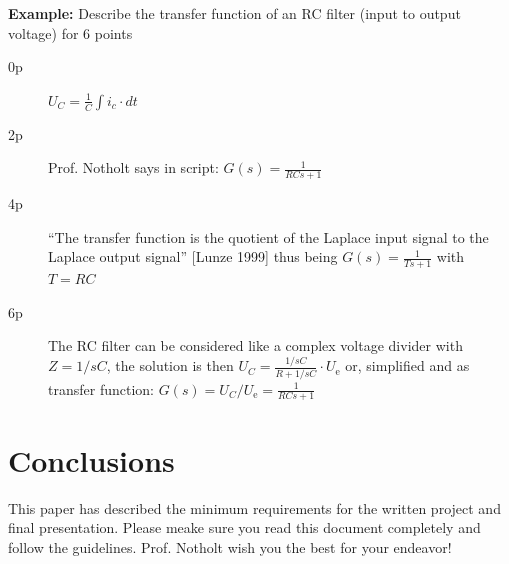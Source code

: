 	{\bfseries Example:} Describe the transfer function of an RC filter (input to output voltage) for 6 points
	
	\begin{description}
		\item[0p] $U_{C} = \frac{1}{C}\int i_{c} \cdot dt$
		\item[2p] Prof. Notholt says in script: $G(s) = \frac{1}{RCs+1}$
		\item[4p] ``The transfer function is the quotient of the Laplace input signal to the Laplace output signal'' [Lunze 1999] thus being $G(s) = \frac{1}{Ts+1}$ with $T=RC$
		\item[6p] The RC filter can be considered like a complex voltage divider with $Z = 1/sC$, the solution is then $U_{C} = \frac{1/sC}{R + 1/sC} \cdot U_\textrm{e}$ or, simplified and as transfer function: $G(s) = U_{C}/U_\textrm{e} = \frac{1}{RCs + 1}$ 
	\end{description}
	
	
	\section{Conclusions}
	
	This paper has described the minimum requirements for the written project and final presentation. Please meake sure you read this document completely and follow the guidelines. Prof. Notholt wish you the best for your endeavor!

